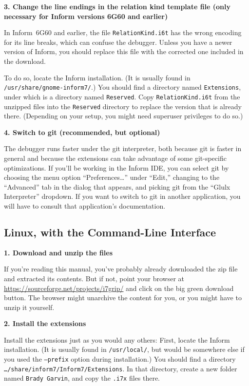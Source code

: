 \documentclass{book}
\newcommand{\lastpagebreak}{\vfill\pagebreak}
\begin{document}
\textbf{3. Change the line endings in the relation kind template file (only
  necessary for Inform versions 6G60 and earlier)}

In Inform~6G60 and earlier, the file \texttt{RelationKind.i6t} has the wrong
encoding for its line breaks, which can confuse the debugger.  Unless you have a
newer version of Inform, you should replace this file with the corrected one
included in the download.

To do so, locate the Inform installation.  (It is usually found in
\texttt{/usr/share/gnome-inform7/}.)  You should find a directory named
\texttt{Extensions}, under which is a directory named \texttt{Reserved}.  Copy
\texttt{RelationKind.i6t} from the unzipped files into the \texttt{Reserved}
directory to replace the version that is already there.  (Depending on your
setup, you might need superuser privileges to do so.)

\textbf{4. Switch to git (recommended, but optional)}

The debugger runs faster under the git interpreter, both because git is faster
in general and because the extensions can take advantage of some git-specific
optimizations.  If you'll be working in the Inform IDE, you can select git by
choosing the menu option ``Preferences\dots'' under ``Edit,'' changing to the
``Advanced'' tab in the dialog that appears, and picking git from the ``Glulx
Interpreter'' dropdown.  If you want to switch to git in another application,
you will have to consult that application's documentation.

\lastpagebreak

\subsection{Linux, with the Command-Line Interface}

\textbf{1. Download and unzip the files}

If you're reading this manual, you've probably already downloaded the zip file
and extracted its contents.  But if not, point your browser at
\url{https://sourceforge.net/projects/i7grip/} and click on the big green
download button.  The browser might unarchive the content for you, or you might
have to unzip it yourself.

\textbf{2. Install the extensions}

Install the extensions just as you would any others: First, locate the Inform
installation.  (It is usually found in \texttt{/usr/local/}, but would be
somewhere else if you used the \texttt{--prefix} option during installation.)
You should find a directory \texttt{\dots/share/inform7/Inform7/Extensions}.  In
that directory, create a new folder named \texttt{Brady Garvin},
and copy the \texttt{.i7x} files there.
\end{document}
